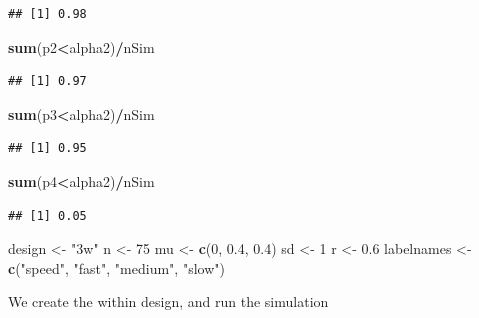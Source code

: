 \documentclass[]{book}
\newenvironment{Shaded}{\begin{snugshade}}{\end{snugshade}}
\newcommand{\DecValTok}[1]{\textcolor[rgb]{0.00,0.00,0.81}{#1}}
\newcommand{\FloatTok}[1]{\textcolor[rgb]{0.00,0.00,0.81}{#1}}
\newcommand{\KeywordTok}[1]{\textcolor[rgb]{0.13,0.29,0.53}{\textbf{#1}}}
\newcommand{\NormalTok}[1]{#1}
\newcommand{\OperatorTok}[1]{\textcolor[rgb]{0.81,0.36,0.00}{\textbf{#1}}}
\newcommand{\StringTok}[1]{\textcolor[rgb]{0.31,0.60,0.02}{#1}}
\begin{document}
\begin{verbatim}
## [1] 0.98
\end{verbatim}

\begin{Shaded}
\begin{Highlighting}[]
\KeywordTok{sum}\NormalTok{(p2}\OperatorTok{<}\NormalTok{alpha2)}\OperatorTok{/}\NormalTok{nSim}
\end{Highlighting}
\end{Shaded}

\begin{verbatim}
## [1] 0.97
\end{verbatim}

\begin{Shaded}
\begin{Highlighting}[]
\KeywordTok{sum}\NormalTok{(p3}\OperatorTok{<}\NormalTok{alpha2)}\OperatorTok{/}\NormalTok{nSim}
\end{Highlighting}
\end{Shaded}

\begin{verbatim}
## [1] 0.95
\end{verbatim}

\begin{Shaded}
\begin{Highlighting}[]
\KeywordTok{sum}\NormalTok{(p4}\OperatorTok{<}\NormalTok{alpha2)}\OperatorTok{/}\NormalTok{nSim}
\end{Highlighting}
\end{Shaded}

\begin{verbatim}
## [1] 0.05
\end{verbatim}

\begin{Shaded}
\begin{Highlighting}[]
\NormalTok{design <-}\StringTok{ "3w"}
\NormalTok{n <-}\StringTok{ }\DecValTok{75}
\NormalTok{mu <-}\StringTok{ }\KeywordTok{c}\NormalTok{(}\DecValTok{0}\NormalTok{, }\FloatTok{0.4}\NormalTok{, }\FloatTok{0.4}\NormalTok{)}
\NormalTok{sd <-}\StringTok{ }\DecValTok{1}
\NormalTok{r <-}\StringTok{ }\FloatTok{0.6}
\NormalTok{labelnames <-}\StringTok{ }\KeywordTok{c}\NormalTok{(}\StringTok{"speed"}\NormalTok{, }\StringTok{"fast"}\NormalTok{, }\StringTok{"medium"}\NormalTok{, }\StringTok{"slow"}\NormalTok{)}
\end{Highlighting}
\end{Shaded}

We create the within design, and run the simulation
\end{document}
